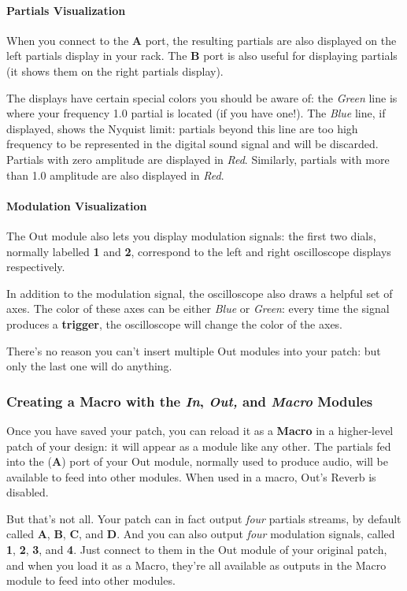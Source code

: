 \documentclass{article}
\begin{document}
\paragraph{Partials Visualization}  When you connect to the {\bf A} port, the resulting partials are also displayed on the left partials display in your rack.  The {\bf B} port is also useful for displaying partials (it shows them on the right partials display).  

The displays have certain special colors you should be aware of: the {\it Green} line is where your frequency 1.0 partial is located (if you have one!).  The {\it Blue} line, if displayed, shows the Nyquist limit: partials beyond this line are too high frequency to be represented in the digital sound signal and will be discarded.  Partials with zero amplitude are displayed in {\it Red}.  Similarly, partials with more than 1.0 amplitude are also displayed in {\it Red}.

\paragraph{Modulation Visualization} The Out module also lets you display modulation signals: the first two dials, normally labelled {\bf 1} and {\bf 2}, correspond to the left and right oscilloscope displays respectively.

In addition to the modulation signal, the oscilloscope also draws a helpful set of axes.  The color of these axes can be either {\it Blue} or {\it Green}: every time the signal produces a {\bf trigger}, the oscilloscope will change the color of the axes.

There's no reason you can't insert multiple Out modules into your patch: but only the last one will do anything.

\subsubsection{Creating a Macro with the \textit{In}, \textit{Out,} and \textit{Macro} Modules}
\label{creatingmacros}

Once you have saved your patch, you can reload it as a {\bf Macro} in a higher-level patch of your design: it will appear as a module like any other.  The partials fed into the ({\bf A}) port of your Out module, normally used to produce audio, will be available to feed into other modules. When used in a macro, Out's Reverb is disabled.

But that's not all.  Your patch can in fact output {\it four} partials streams, by default called {\bf A}, {\bf B}, {\bf C}, and {\bf D}.  And you can also output {\it four} modulation signals, called {\bf 1}, {\bf 2}, {\bf 3}, and {\bf 4}.  Just connect to them in the Out module of your original patch, and when you load it as a Macro, they're all available as outputs in the Macro module to feed into other modules. 
\end{document}
